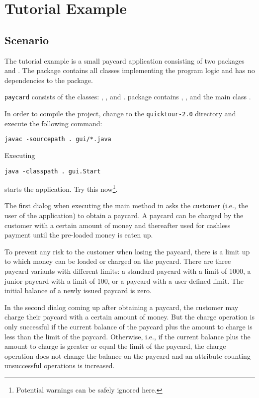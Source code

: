 \section{Tutorial Example}

\subsection{Scenario}
The tutorial example is a small paycard application consisting of two
packages  and . The  package contains all
classes implementing the program logic and has no dependencies to the
 package.

\texttt{paycard} consists of the classes: ,
, and .  package contains ,
, and the main class . 

In order to compile the project, change to the \texttt{quicktour-2.0} directory and
execute the following command:

\verb+javac -sourcepath . gui/*.java+

\noindent Executing

\verb+java -classpath . gui.Start+

\noindent starts the application. Try this now\footnote{Potential
  warnings can be safely ignored here.}.

The first dialog when executing the main method in  asks the
customer (i.e., the user of the application) to obtain a paycard. A
paycard can be charged by the customer with a certain amount of money
and thereafter used for cashless payment until the pre-loaded money is
eaten up. 

To prevent any risk to the customer when losing the paycard, there
is a limit up to which money can be loaded or charged on the
paycard. There are three paycard variants
with different limits: a standard paycard with a limit of 1000, a junior
paycard with a limit of 100, or a paycard with a user-defined limit.
The initial balance of a newly issued paycard is zero. 

In the second dialog coming up after obtaining a paycard, the customer
may charge their paycard with a certain amount of money. But the charge
operation is only successful if the current balance of the paycard
plus the amount to charge is less than the limit of the
paycard. Otherwise, i.e., if the current balance plus the amount to
charge is greater or equal the limit of the paycard, the charge
operation does not change the balance on the paycard and an attribute 
counting unsuccessful operations is increased. 

